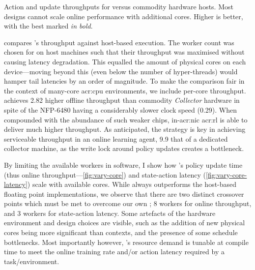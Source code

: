 \begin{table}
	\caption[Action and update throughputs for \approachshort{} versus commodity hardware hosts.]{Action and update throughputs for \approachshort{} versus commodity hardware hosts. Most designs cannot scale online performance with additional cores. Higher is better, with the best marked \emph{in bold}.\label{tab:tputs}}
\end{table}

 compares \approachshort{}'s throughput against host-based execution.
The worker count was chosen for on host machines such that their throughput was maximised without causing latency degradation.
This equalled the amount of physical cores on each device---moving beyond this (even below the number of hyper-threads) would hamper tail latencies by an order of magnitude.
To make the comparison fair in the context of many-core \gls{acr:cpu} environments, we include per-core throughput.
\Indfw{} achieves \qty{2.82}{\times} higher offline throughput than commodity \emph{Collector} hardware in spite of the NFP-6480 having a considerably slower clock speed (\qty{0.29}{\times}).
When compounded with the abundance of such weaker chips, in-\gls{acr:nic} \gls{acr:rl} is able to deliver much higher throughput.
As anticipated, the \Coopfw{} strategy is key in achieving serviceable throughput in an online learning agent, \qty{9.9}{\times} that of a dedicated collector machine, as the write lock around policy updates creates a bottleneck.

By limiting the available workers in software, I show how \Coopfw{}'s policy update time (thus  online throughput---\cref{fig:vary-core}) and state-action latency (\cref{fig:vary-core-latency}) scale with available cores.
While \Coopfw{} always outperforms the host-based floating point implementations, we observe that there are two distinct crossover points which must be met to overcome our own \Indfw{}; \num{8} workers for online throughput, and \num{3} workers for state-action latency.
Some artefacts of the hardware environment and design choices are visible, such as the addition of new physical cores being more significant than contexts, and the presence of some schedule bottlenecks.
Most importantly however, \Coopfw{}'s resource demand is tunable at compile time to meet the online training rate and/or action latency required by a task/environment.

